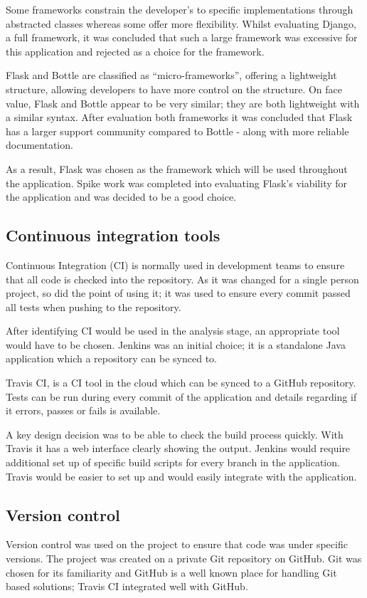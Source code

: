 Some frameworks constrain the developer's to specific implementations through abstracted classes whereas some offer more flexibility. Whilst evaluating Django, a full framework, it was concluded that such a large framework was excessive for this application and rejected as a choice for the framework.

Flask and Bottle are classified as ``micro-frameworks'', offering a lightweight structure, allowing developers to have more control on the structure. On face value, Flask and Bottle appear to be very similar; they are both lightweight with a similar syntax. After evaluation both frameworks it was concluded that Flask has a larger support community compared to Bottle - along with more reliable documentation.

As a result, Flask was chosen as the framework which will be used throughout the application. Spike work was completed into evaluating Flask's viability for the application and was decided to be a good choice.

\subsection{Continuous integration tools}
Continuous Integration (CI) is normally used in development teams to ensure that all code is checked into the repository. As it was changed for a single person project, so did the point of using it; it was used to ensure every commit passed all tests when pushing to the repository.

After identifying CI would be used in the analysis stage, an appropriate tool would have to be chosen. Jenkins was an initial choice; it is a standalone Java application which a repository can be synced to.

Travis CI, is a CI tool in the cloud which can be synced to a GitHub repository. Tests can be run during every commit of the application and details regarding if it errors, passes or fails is available.

A key design decision was to be able to check the build process quickly. With Travis it has a web interface clearly showing the output. Jenkins would require additional set up of specific build scripts for every branch in the application. Travis would be easier to set up and would easily integrate with the application.

\subsection{Version control}
Version control was used on the project to ensure that code was under specific versions. The project was created on a private Git repository on GitHub. Git was chosen for its familiarity and GitHub is a well known place for handling Git based solutions; Travis CI integrated well with GitHub.

